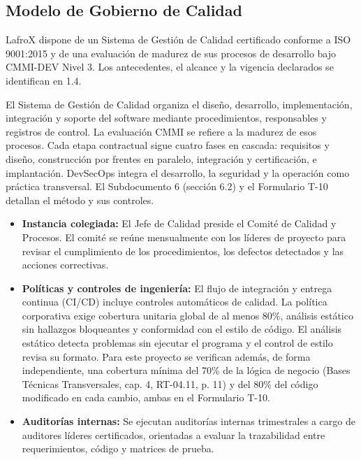 \subsection{Modelo de Gobierno de Calidad}
LafroX dispone de un Sistema de Gestión de Calidad certificado conforme a ISO 9001:2015 y de una evaluación de madurez de sus procesos de desarrollo bajo CMMI-DEV Nivel 3. Los antecedentes, el alcance y la vigencia declarados se identifican en 1.4.

El Sistema de Gestión de Calidad organiza el diseño, desarrollo, implementación, integración y soporte del software mediante procedimientos, responsables y registros de control. La evaluación CMMI se refiere a la madurez de esos procesos. Cada etapa contractual sigue cuatro fases en cascada: requisitos y diseño, construcción por frentes en paralelo, integración y certificación, e implantación. DevSecOps integra el desarrollo, la seguridad y la operación como práctica transversal. El Subdocumento 6 (sección 6.2) y el Formulario T-10 detallan el método y sus controles.

\begin{itemize}
    \item \textbf{Instancia colegiada:} El Jefe de Calidad preside el Comité de Calidad y Procesos. El comité se reúne mensualmente con los líderes de proyecto para revisar el cumplimiento de los procedimientos, los defectos detectados y las acciones correctivas.
    \item \textbf{Políticas y controles de ingeniería:} El flujo de integración y entrega continua (CI/CD) incluye controles automáticos de calidad. La política corporativa exige cobertura unitaria global de al menos 80\%, análisis estático sin hallazgos bloqueantes y conformidad con el estilo de código. El análisis estático detecta problemas sin ejecutar el programa y el control de estilo revisa su formato. Para este proyecto se verifican además, de forma independiente, una cobertura mínima del 70\% de la lógica de negocio (Bases Técnicas Transversales, cap. 4, RT-04.11, p. 11) y del 80\% del código modificado en cada cambio, ambas en el Formulario T-10.
    \item \textbf{Auditorías internas:} Se ejecutan auditorías internas trimestrales a cargo de auditores líderes certificados, orientadas a evaluar la trazabilidad entre requerimientos, código y matrices de prueba.
\end{itemize}

